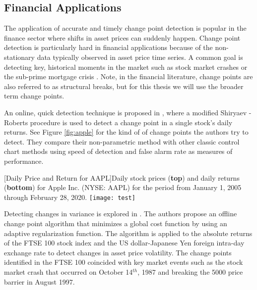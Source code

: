 \subsection{Financial Applications}
The application of accurate and timely change point detection is popular in the finance sector where shifts in asset prices can suddenly happen. Change point detection is particularly hard in financial applications because of the non-stationary data typically observed in asset price time series. A common goal is detecting key, historical moments in the market such as stock market crashes \cite{banerjee2019change}  or the sub-prime mortgage crisis \cite{zhu2015change}. Note, in the financial literature, change points  are also referred to as structural breaks, but for this thesis we will use the broader term change points.

An online, quick detection technique is proposed in  \cite{pepelyshev2015real}, where a modified Shiryaev - Roberts procedure is used to detect a change point in a single stock's daily returns. See Figure \ref{fig:apple} for the kind of of change points the authors try to detect. They compare their non-parametric method with other classic control chart methods using speed of detection and false alarm rate as measures of performance.
\begin{center} 
[Daily Price and Return for AAPL]{Daily stock prices (\textbf{top}) and daily returns (\textbf{bottom}) for Apple Inc. (NYSE: AAPL) for the period from January 1, 2005 through February 28, 2020.} 
\texttt{[image: test]} 
\label{fig:apple} 
\end{center}

Detecting changes in variance is explored in  \cite{lavielle2007adaptive}. The authors propose an offline change point algorithm that minimizes a global cost function by using an adaptive regularization function. The algorithm is applied to the absolute returns of the FTSE 100 stock index and the US dollar-Japanese Yen foreign intra-day exchange rate to detect changes in asset price volatility. The change points  identified in the FTSE 100 coincided with key market events such as the stock market crash that occurred on October 14$^{th}$, 1987 and breaking the 5000 price barrier in August 1997.


